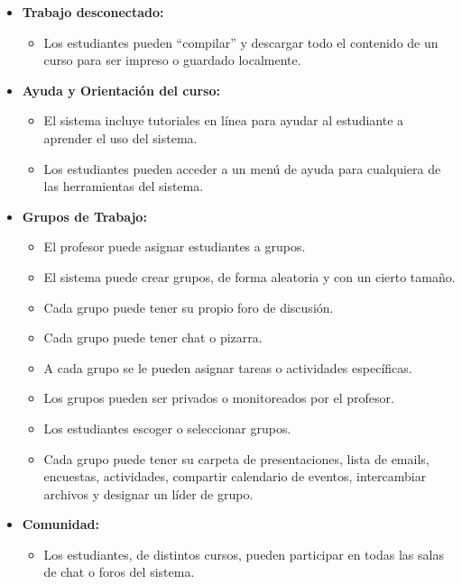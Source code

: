 	\begin{itemize}
		\item \textbf{Trabajo desconectado:}
			\begin{itemize}
				\item Los estudiantes pueden ``compilar'' y descargar todo el contenido de un curso para ser impreso o guardado localmente.
			\end{itemize}
	\end{itemize}
	\begin{itemize}
		\item \textbf{Ayuda y Orientación del curso:}
			\begin{itemize}
				\item El sistema incluye tutoriales en línea para ayudar al estudiante a aprender el uso del sistema.
				\item Los estudiantes pueden acceder a un menú de ayuda para cualquiera de las herramientas del sistema.
			\end{itemize}
	\end{itemize}
	\begin{itemize}
		\item \textbf{Grupos de Trabajo:}
			\begin{itemize}
				\item El profesor puede asignar estudiantes a grupos.
				\item El sistema puede crear grupos, de forma aleatoria y con un cierto tamaño.
				\item Cada grupo puede tener su propio foro de discusión.
				\item Cada grupo puede tener chat o pizarra.
				\item A cada grupo se le pueden asignar tareas o actividades específicas.
				\item Los grupos pueden ser privados o monitoreados por el profesor.
				\item Los estudiantes escoger o seleccionar grupos.
				\item Cada grupo puede tener su carpeta de presentaciones, lista de emails, encuestas, actividades, compartir calendario de eventos, intercambiar archivos y designar un líder de grupo.
			\end{itemize}
	\end{itemize}
	\begin{itemize}
		\item \textbf{Comunidad:}
			\begin{itemize}
				\item Los estudiantes, de distintos cursos, pueden participar en todas las salas de chat o foros del sistema.
			\end{itemize}
	\end{itemize}
